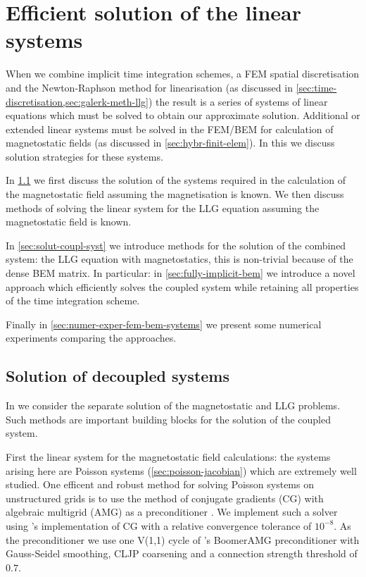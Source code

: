\chapter{Efficient solution of the linear systems}
\label{sec:solution-strategies}

\newcommand{\Nn}{N}

When we combine implicit time integration schemes, a FEM spatial discretisation and the Newton-Raphson method for linearisation (as discussed in \cref{sec:time-discretisation,sec:galerk-meth-llg}) the result is a series of systems of linear equations which must be solved to obtain our approximate solution.
Additional or extended linear systems must be solved in the FEM/BEM for calculation of magnetostatic fields (as discussed in \cref{sec:hybr-finit-elem}).
In this  we discuss solution strategies for these systems.

In \cref{sec:llg-only-system} we first discuss the solution of the systems required in the calculation of the magnetostatic field assuming the magnetisation is known.
We then discuss methods of solving the linear system for the LLG equation assuming the magnetostatic field is known.

In \cref{sec:solut-coupl-syst} we introduce methods for the solution of the combined system: the LLG equation with magnetostatics, this is non-trivial because of the dense BEM matrix.
In particular: in \cref{sec:fully-implicit-bem} we introduce a novel approach which efficiently solves the coupled system while retaining all properties of the time integration scheme.

Finally in \cref{sec:numer-exper-fem-bem-systems} we present some numerical experiments comparing the approaches.


\section{Solution of decoupled systems}
\label{sec:llg-only-system}

In  we consider the separate solution of the magnetostatic and LLG problems.
Such methods are important building blocks for the solution of the coupled system.

First the linear system for the magnetostatic field calculations: the systems arising here are Poisson systems (\cref{sec:poisson-jacobian}) which are extremely well studied.
One efficent and robust method for solving Poisson systems on unstructured grids is to use the method of conjugate gradients (CG) with algebraic multigrid (AMG) as a preconditioner \cite[Chap. 2]{HowardElmanDavidSilvester2006}.
We implement such a solver using \oomph's implementation of CG with a relative convergence tolerance of $10^{-8}$.
As the preconditioner we use one V(1,1) cycle of \hypre's BoomerAMG preconditioner \cite{hypre} with Gauss-Seidel smoothing, CLJP coarsening and a connection strength threshold of $0.7$.


